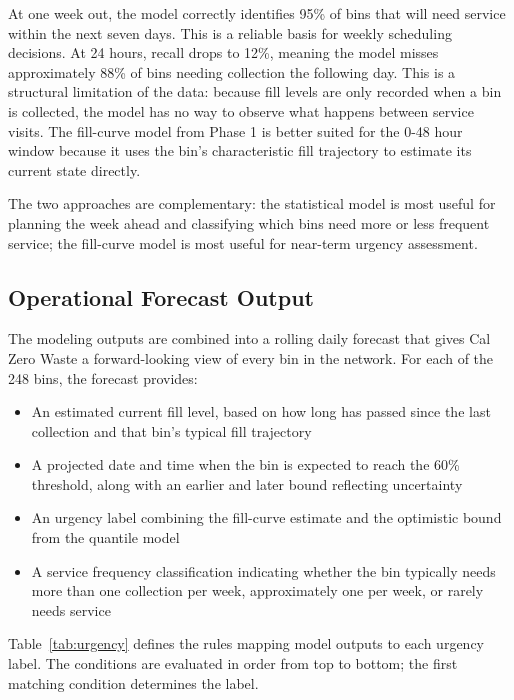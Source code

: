 \documentclass[11pt]{article}
\begin{document}
At one week out, the model correctly identifies 95\% of bins that will need service
within the next seven days. This is a reliable basis for weekly scheduling decisions. At 24
hours, recall drops to 12\%, meaning the model misses approximately 88\% of bins needing
collection the following day. This is a structural limitation of the data: because fill
levels are only recorded when a bin is collected, the model has no way to observe what
happens between service visits. The fill-curve model from Phase 1 is better suited for
the 0-48 hour window because it uses the bin's characteristic fill trajectory to estimate
its current state directly.

The two approaches are complementary: the statistical model is most useful for planning
the week ahead and classifying which bins need more or less frequent service; the
fill-curve model is most useful for near-term urgency assessment.

\subsection{Operational Forecast Output}

The modeling outputs are combined into a rolling daily forecast that gives Cal Zero Waste
a forward-looking view of every bin in the network. For each of the 248 bins, the forecast
provides:

\begin{itemize}
  \item An estimated current fill level, based on how long has passed since the last
  collection and that bin's typical fill trajectory
  \item A projected date and time when the bin is expected to reach the 60\% threshold,
  along with an earlier and later bound reflecting uncertainty
  \item An urgency label combining the fill-curve estimate and the optimistic bound from
  the quantile model
  \item A service frequency classification indicating whether the bin typically needs
  more than one collection per week, approximately one per week, or rarely needs service
\end{itemize}

Table~\ref{tab:urgency} defines the rules mapping model outputs to each urgency label.
The conditions are evaluated in order from top to bottom; the first matching condition
determines the label.
\end{document}
